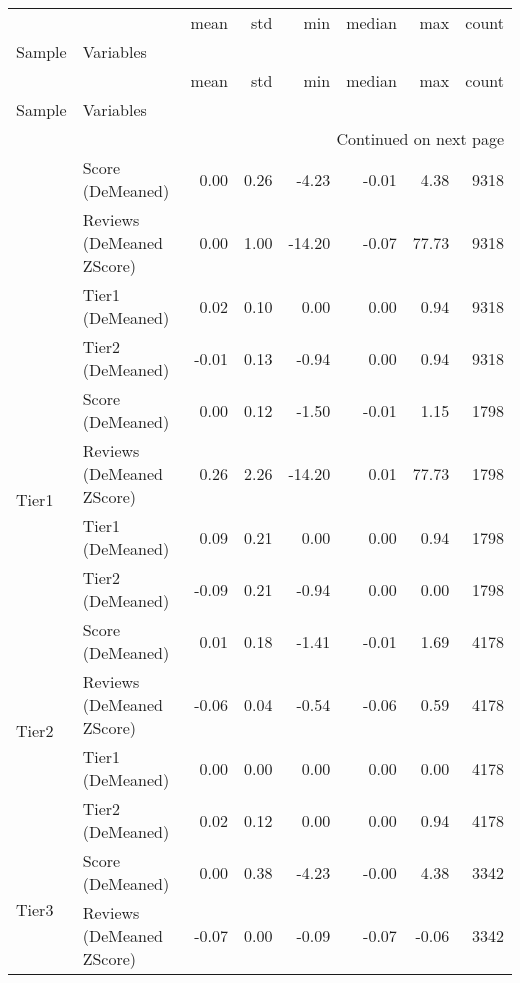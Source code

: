 \begin{longtable}[h!]{llrrrrrr}
\toprule
        &                  &  mean &   std &    min &  median &    max &  count \\
Sample & Variables &       &       &        &         &        &        \\
\midrule
\endfirsthead

\toprule
        &                  &  mean &   std &    min &  median &    max &  count \\
Sample & Variables &       &       &        &         &        &        \\
\midrule
\endhead
\midrule
\multicolumn{8}{r}{{Continued on next page}} \\
\midrule
\endfoot

\bottomrule
\endlastfoot
\multirow{4}{*}{Full} & Score (DeMeaned) &  0.00 &  0.26 &  -4.23 &   -0.01 &   4.38 &   9318 \\
        & Reviews (DeMeaned ZScore) &  0.00 &  1.00 & -14.20 &   -0.07 &  77.73 &   9318 \\
        & Tier1 (DeMeaned) &  0.02 &  0.10 &   0.00 &    0.00 &   0.94 &   9318 \\
        & Tier2 (DeMeaned) & -0.01 &  0.13 &  -0.94 &    0.00 &   0.94 &   9318 \\
\cline{1-8}
\multirow{4}{*}{Tier1} & Score (DeMeaned) &  0.00 &  0.12 &  -1.50 &   -0.01 &   1.15 &   1798 \\
        & Reviews (DeMeaned ZScore) &  0.26 &  2.26 & -14.20 &    0.01 &  77.73 &   1798 \\
        & Tier1 (DeMeaned) &  0.09 &  0.21 &   0.00 &    0.00 &   0.94 &   1798 \\
        & Tier2 (DeMeaned) & -0.09 &  0.21 &  -0.94 &    0.00 &   0.00 &   1798 \\
\cline{1-8}
\multirow{4}{*}{Tier2} & Score (DeMeaned) &  0.01 &  0.18 &  -1.41 &   -0.01 &   1.69 &   4178 \\
        & Reviews (DeMeaned ZScore) & -0.06 &  0.04 &  -0.54 &   -0.06 &   0.59 &   4178 \\
        & Tier1 (DeMeaned) &  0.00 &  0.00 &   0.00 &    0.00 &   0.00 &   4178 \\
        & Tier2 (DeMeaned) &  0.02 &  0.12 &   0.00 &    0.00 &   0.94 &   4178 \\
\cline{1-8}
\multirow{4}{*}{Tier3} & Score (DeMeaned) &  0.00 &  0.38 &  -4.23 &   -0.00 &   4.38 &   3342 \\
        & Reviews (DeMeaned ZScore) & -0.07 &  0.00 &  -0.09 &   -0.07 &  -0.06 &   3342 \\

\end{longtable}
